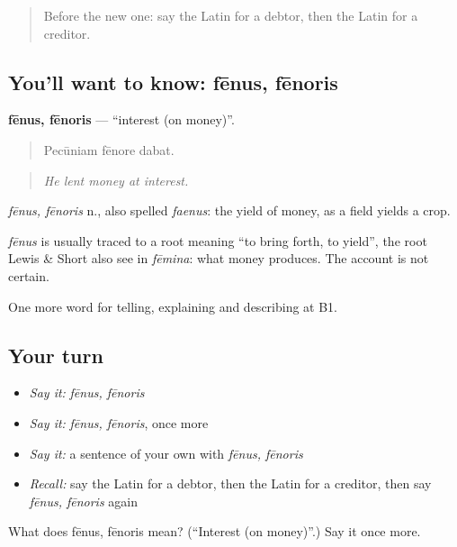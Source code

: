 \begin{quote}
Before the new one: say the Latin for a debtor, then the Latin for a creditor.
\end{quote}

\subsection*{You'll want to know: fēnus, fēnoris}
\textbf{fēnus, fēnoris} — \textquotedblleft{}interest (on money)\textquotedblright{}.

\begin{quote}
Pecūniam fēnore dabat.
\end{quote}

\begin{quote}
\emph{He lent money at interest.}
\end{quote}

\emph{fēnus, fēnoris} n., also spelled \emph{faenus}: the yield of money, as a field yields a crop.

\begin{cousinweb}
\emph{fēnus} is usually traced to a root meaning \textquotedblleft{}to bring forth, to yield\textquotedblright{}, the root Lewis \& Short also see in \emph{fēmina}: what money produces. The account is not certain.
\end{cousinweb}

\begin{grammarlens}[title={What you've built}]
One more word for telling, explaining and describing at B1.
\end{grammarlens}

\subsection*{Your turn}
\begin{itemize}
\raggedright
  \item \emph{Say it:} \emph{fēnus, fēnoris}
  \item \emph{Say it:} \emph{fēnus, fēnoris}, once more
  \item \emph{Say it:} a sentence of your own with \emph{fēnus, fēnoris}
  \item \emph{Recall:} say the Latin for a debtor, then the Latin for a creditor, then say \emph{fēnus, fēnoris} again
\end{itemize}

\begin{tcolorbox}[breakable,colback=teal!4,colframe=teal!35!black,title={Before you move on}]
What does fēnus, fēnoris mean? (\textquotedblleft{}Interest (on money)\textquotedblright{}.) Say it once more.
\end{tcolorbox}
